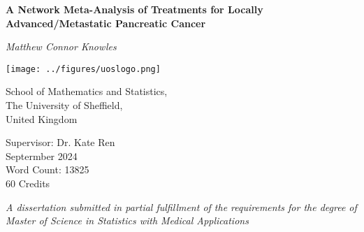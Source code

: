 \begin{titlepage}

    \begin{center}

        \vspace*{1.5cm}

        \textbf{\huge A Network Meta-Analysis of Treatments for Locally Advanced/Metastatic Pancreatic Cancer } 
        
        \vspace*{1.5cm}
        
        \textit{Matthew Connor Knowles}

        \vspace*{1.5cm}
    
        \texttt{[image: ../figures/uoslogo.png]}
        
        \vspace*{1.5cm}
        
        School of Mathematics and Statistics, \\
        The University of Sheffield, \\
        United Kingdom \\

        \vspace*{0.5cm}

        Supervisor: Dr. Kate Ren \\

        Septermber 2024 \\

        Word Count: 13825\\

        60 Credits \\
        
        \vspace*{1.5cm}

        \textit{A dissertation submitted in partial fulfillment of the requirements for the degree of Master of Science in 
        Statistics with Medical Applications}
    \end{center}
    
\end{titlepage}
